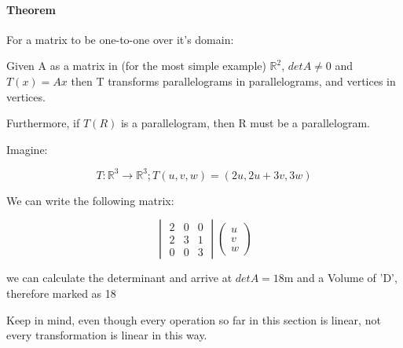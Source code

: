 \documentclass[11pt,fleqn]{book} %
\begin{document}
\paragraph*{Theorem}
For a matrix to be one-to-one over it's domain:

Given A as a matrix in (for the most simple example) $\mathbb{R}^2$, $det A \neq 0$ and $T(x) = Ax$ then T transforms parallelograms in parallelograms, and
vertices in vertices. 

Furthermore, if $T(R)$ is a parallelogram, then R must be a parallelogram.

\begin{example}
    Imagine: 

\begin{equation}
    T: \mathbb{R}^3 \to \mathbb{R}^3; T(u,v,w) = (2u, 2u+3v, 3w)
\end{equation}

We can write the following matrix:

\begin{equation}
    \begin{vmatrix}
        2 & 0 & 0 \\
        2 & 3 & 1 \\
        0 & 0 & 3
    \end{vmatrix} \begin{pmatrix}
        u \\
        v \\ 
        w 
    \end{pmatrix}
\end{equation}

we can calculate the determinant and arrive at $detA = 18$m and a Volume of 'D', therefore marked as 18 

Keep in mind, even though every operation so far in this section is linear, not every transformation is linear in this way. 

\end{example}
\end{document}
